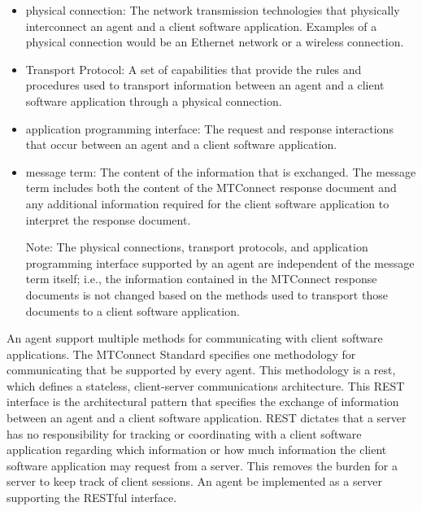 \begin{itemize}
\item \gls{physical connection}:  The network transmission technologies that physically interconnect an \gls{agent} and a client software application.  Examples of a \gls{physical connection} would be an Ethernet network or a wireless connection.

\item Transport Protocol:  A set of capabilities that provide the rules and procedures used to transport information between an \gls{agent} and a client software application through a \gls{physical connection}.

\item \gls{application programming interface}:  The \gls{request} and \gls{response} interactions that occur between an \gls{agent} and a client software application.

\item \gls{message term}:  The content of the information that is exchanged.  The \gls{message term} includes both the content of the MTConnect \gls{response document} and any additional information required for the client software application to interpret the \gls{response document}.

\begin{note}
Note: The \glspl{physical connection}, \glspl{transport protocol}, and \gls{application programming interface} supported by an \gls{agent} are independent of the \gls{message term} itself; i.e., the information contained in the MTConnect \glspl{response document} is not changed based on the methods used to transport those documents to a client software application.

\end{note}
\end{itemize}

An \gls{agent} \MAY support multiple methods for communicating with client software applications.  The MTConnect Standard specifies one methodology for communicating that \MUST be supported by every \gls{agent}.  This methodology is a \gls{rest}, which defines a stateless, client-server communications architecture.  This REST interface is the architectural pattern that specifies the exchange of information between an \gls{agent} and a client software application.  REST dictates that a server has no responsibility for tracking or coordinating with a client software application regarding which information or how much information the client software application may request from a server.  This removes the burden for a server to keep track of client sessions.  An \gls{agent} \MUST be implemented as a server supporting the RESTful interface. 

